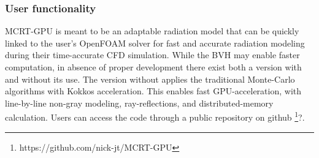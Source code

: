 \subsubsection{User functionality}
MCRT-GPU is meant to be an adaptable radiation model that can be quickly linked to the user's OpenFOAM solver for fast and accurate radiation modeling during their time-accurate CFD simulation.
While the BVH may enable faster computation, in absence of proper development there exist both a version with and without its use.
The version without applies the traditional Monte-Carlo algorithms with Kokkos acceleration. This enables fast GPU-acceleration, with line-by-line non-gray modeling, ray-reflections, and distributed-memory calculation.
Users can access the code through a public repository on github \footnote{https://github.com/nick-jt/MCRT-GPU}?.